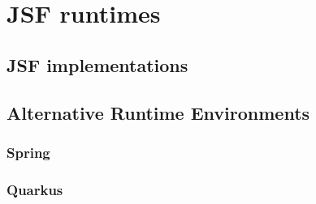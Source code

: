 %

\chapter{JSF runtimes}

\section{JSF implementations}

\section{Alternative Runtime Environments}

\subsection{Spring}

\subsection{Quarkus}



